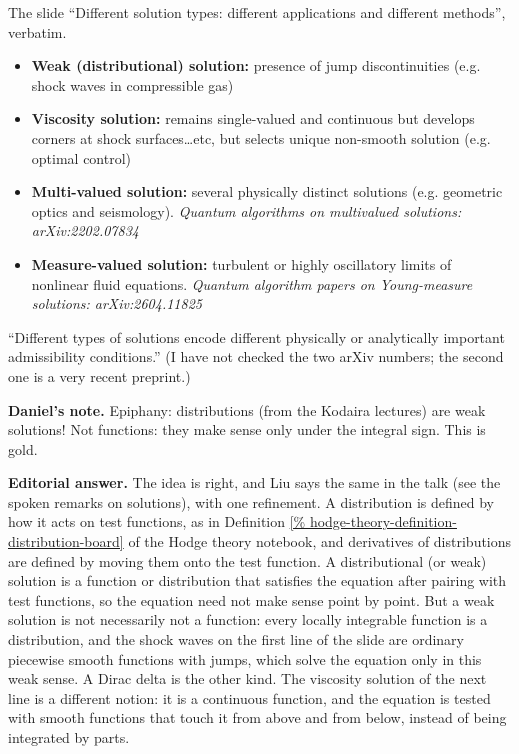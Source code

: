 \begin{remark}
\label{remark-liu-solution-types}
The slide ``Different solution types:
different applications and different
methods'', verbatim.
\begin{itemize}
\item {\bf Weak (distributional) solution:}
presence of jump discontinuities (e.g. shock
waves in compressible gas)

\item {\bf Viscosity solution:} remains
single-valued and continuous but develops
corners at shock surfaces\dots etc, but
selects unique non-smooth solution (e.g.
optimal control)

\item {\bf Multi-valued solution:} several
physically distinct solutions (e.g.
geometric optics and seismology). {\it Quantum
algorithms on multivalued solutions:
arXiv:2202.07834}

\item {\bf Measure-valued solution:} turbulent
or highly oscillatory limits of nonlinear
fluid equations. {\it Quantum algorithm
papers on Young-measure solutions:
arXiv:2604.11825}
\end{itemize}
``Different types of solutions encode
different physically or analytically
important admissibility conditions.''
(I have not checked the two arXiv numbers; the
second one is a very recent preprint.)
\end{remark}

\medskip\noindent
{\bf Daniel's note.}
Epiphany: distributions (from the Kodaira
lectures) are weak solutions! Not functions:
they make sense only under the integral sign.
This is gold.

\medskip\noindent
{\bf Editorial answer.}
The idea is right, and Liu says the same in
the talk (see the spoken remarks on
solutions), with one refinement.
A distribution is defined by how it acts on
test functions, as in Definition
\ref{%
hodge-theory-definition-distribution-board}
of the Hodge theory notebook, and
derivatives of distributions are defined by
moving them onto the test function. A
distributional (or weak) solution is a
function or distribution that satisfies the
equation after pairing with test functions,
so the equation need not make sense point by
point. But a weak solution is not
necessarily not a function: every locally
integrable function is a distribution, and
the shock waves on the first line of the
slide are ordinary piecewise smooth
functions with jumps, which solve the
equation only in this weak sense. A Dirac
delta is the other kind. The viscosity
solution of the next line is a different
notion: it is a continuous function, and the
equation is tested with smooth functions that
touch it from above and from below, instead of
being integrated by parts.

